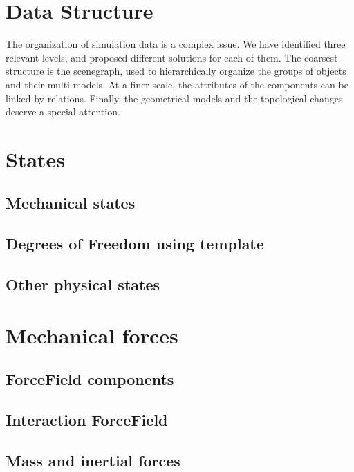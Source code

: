 \documentclass[a4paper,10pt]{report}
\begin{document}
\chapter{Data Structure}
The organization of simulation data is a complex issue. We have identified three relevant levels, and proposed different solutions for each of them.
The coarsest structure is the scenegraph, used to hierarchically organize the groups of objects and their multi-models.
At a finer scale, the attributes of the components can be linked by relations.
Finally, the geometrical models and the topological changes deserve a special attention.
\graphicspath{{../datastructure/}}  %




\chapter{States}
\section{Mechanical states}
\section{Degrees of Freedom using template}
\section{Other physical states}


\chapter{Mechanical forces}
\section{ForceField components}

\section{Interaction ForceField}
\label{sec:interactionforcefield}

\section{Mass and inertial forces}
\end{document}
